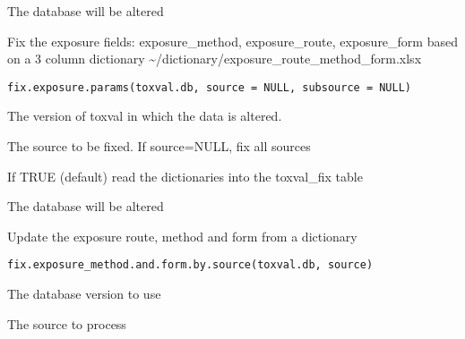 \documentclass[letterpaper]{book}
\begin{document}
%
\begin{Value}
The database will be altered
\end{Value}
%
\begin{Description}\relax
Fix the exposure fields: exposure\_method, exposure\_route, exposure\_form
based on a 3 column dictionary \textasciitilde{}/dictionary/exposure\_route\_method\_form.xlsx
\end{Description}
%
\begin{Usage}
\begin{verbatim}
fix.exposure.params(toxval.db, source = NULL, subsource = NULL)
\end{verbatim}
\end{Usage}
%
\begin{Arguments}
\begin{ldescription}
\item[\code{toxval.db}] The version of toxval in which the data is altered.

\item[\code{source}] The source to be fixed. If source=NULL, fix all sources

\item[\code{fill.toxval\_fix}] If TRUE (default) read the dictionaries into the toxval\_fix table
\end{ldescription}
\end{Arguments}
%
\begin{Value}
The database will be altered
\end{Value}
%
\begin{Description}\relax
Update the exposure route, method and form from a dictionary
\end{Description}
%
\begin{Usage}
\begin{verbatim}
fix.exposure_method.and.form.by.source(toxval.db, source)
\end{verbatim}
\end{Usage}
%
\begin{Arguments}
\begin{ldescription}
\item[\code{toxval.db}] The database version to use

\item[\code{source}] The source to process
\end{ldescription}
\end{Arguments}
\end{document}
